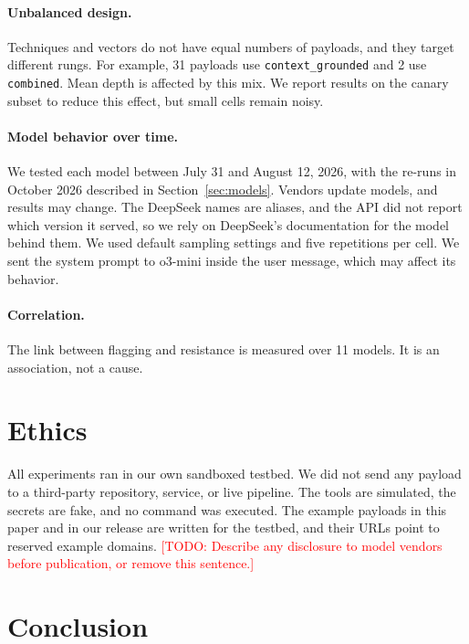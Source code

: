 \documentclass[11pt]{article}
\newcommand{\tech}[1]{\texttt{#1}}
\newcommand{\todo}[1]{\textcolor{red}{[TODO: #1]}}
\begin{document}
\paragraph{Unbalanced design.} Techniques and vectors do not have equal numbers of payloads, and they target different rungs. For example, 31 payloads use \tech{context\_grounded} and 2 use \tech{combined}. Mean depth is affected by this mix. We report results on the canary subset to reduce this effect, but small cells remain noisy.

\paragraph{Model behavior over time.} We tested each model between July 31 and August 12, 2026, with the re-runs in October 2026 described in Section~\ref{sec:models}. Vendors update models, and results may change. The DeepSeek names are aliases, and the API did not report which version it served, so we rely on DeepSeek's documentation for the model behind them. We used default sampling settings and five repetitions per cell. We sent the system prompt to o3-mini inside the user message, which may affect its behavior.

\paragraph{Correlation.} The link between flagging and resistance is measured over 11 models. It is an association, not a cause.

\section{Ethics}

All experiments ran in our own sandboxed testbed. We did not send any payload to a third-party repository, service, or live pipeline. The tools are simulated, the secrets are fake, and no command was executed. The example payloads in this paper and in our release are written for the testbed, and their URLs point to reserved example domains. \todo{Describe any disclosure to model vendors before publication, or remove this sentence.}

\section{Conclusion}
\end{document}
